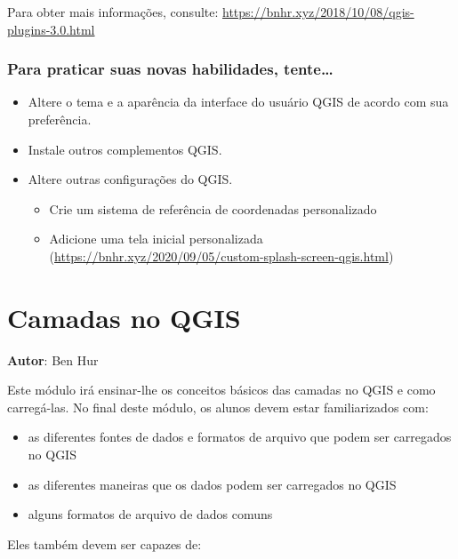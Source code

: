 \documentclass[
]{krantz}
\providecommand{\tightlist}{%
  \setlength{\itemsep}{0pt}\setlength{\parskip}{0pt}}
\begin{document}
Para obter mais informações, consulte: \href{https://bnhr.xyz/2018/10/08/qgis-plugins-3.0.\%20html}{https://bnhr.xyz/2018/10/08/qgis-plugins-3.0.html}

\hypertarget{para-praticar-suas-novas-habilidades-tente}{%
\subsection{Para praticar suas novas habilidades, tente\ldots{}}\label{para-praticar-suas-novas-habilidades-tente}}

\begin{itemize}
\tightlist
\item
  Altere o tema e a aparência da interface do usuário QGIS de acordo com sua preferência.
\item
  Instale outros complementos QGIS.
\item
  Altere outras configurações do QGIS.

  \begin{itemize}
  \tightlist
  \item
    Crie um sistema de referência de coordenadas personalizado
  \item
    Adicione uma tela inicial personalizada (\href{https://bnhr.xyz/2020/09/05/custom-splash\%20-screen-qgis.html}{https://bnhr.xyz/2020/09/05/custom-splash-screen-qgis.html})
  \end{itemize}
\end{itemize}

\hypertarget{camadas-no-qgis}{%
\chapter{Camadas no QGIS}\label{camadas-no-qgis}}

\textbf{Autor}: Ben Hur

Este módulo irá ensinar-lhe os conceitos básicos das camadas no QGIS e como carregá-las. No final deste módulo, os alunos devem estar familiarizados com:

\begin{itemize}
\tightlist
\item
  as diferentes fontes de dados e formatos de arquivo que podem ser carregados no QGIS
\item
  as diferentes maneiras que os dados podem ser carregados no QGIS
\item
  alguns formatos de arquivo de dados comuns
\end{itemize}

Eles também devem ser capazes de:
\end{document}
